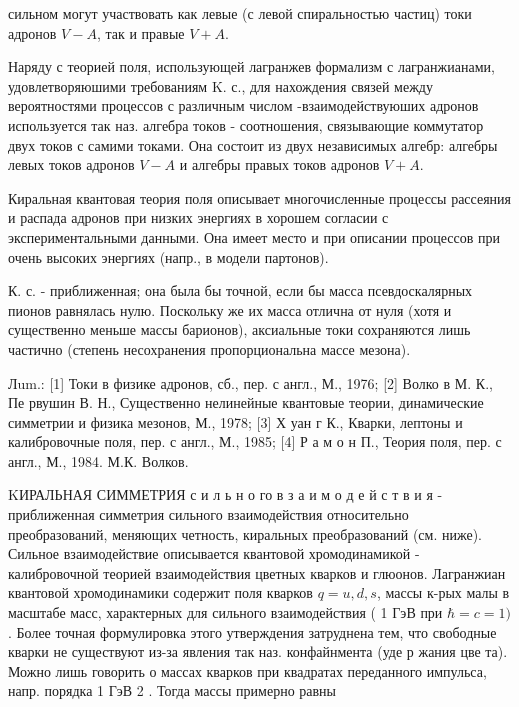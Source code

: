 \documentclass[10pt]{article}
\begin{document}
сильном могут участвовать как левые (с левой спиральностью частиц) токи адронов $V-A$, так и правые $V+A$.



Наряду с теорией поля, использующей лагранжев формализм с лагранжианами, удовлетворяюшими требованиям K. с., для нахождения связей между вероятностями процессов с различным числом -взаимодействуюших адронов используется так наз. алгебра токов - соотношения, связывающие коммутатор двух токов с самими токами. Она состоит из двух независимых алгебр: алгебры левых токов адронов $V-A$ и алгебры правых токов адронов $V+A$.



Киральная квантовая теория поля описывает многочисленные процессы рассеяния и распада адронов при низких энергиях в хорошем согласии с экспериментальными данными. Она имеет место и при описании процессов при очень высоких энергиях (напр., в модели партонов).



К. с. - приближенная; она была бы точной, если бы масса псевдоскалярных пионов равнялась нулю. Поскольку же их масса отлична от нуля (хотя и существенно меньше массы барионов), аксиальные токи сохраняются лишь частично (степень несохранения пропорциональна массе мезона).



Лum.: [1] Токи в физике адронов, сб., пер. с англ., М., 1976; [2] Волко в М. К., Пе рвушин В. Н., Существенно нелинейные квантовые теории, динамические симметрии и физика мезонов, М., 1978; [3] Х уан г К., Кварки, лептоны и калибровочные поля, пер. с англ., М., 1985; [4] Р а м о н П., Теория поля, пер. с англ., М., 1984. М.К. Волков.



KИРАЛЬНАЯ СИММЕТРИЯ с и л ь н о го в з а и м о д е й с т в и я - приближенная симметрия сильного взаимодействия относительно преобразований, меняющих четность, киральных преобразований (см. ниже). Сильное взаимодействие описывается квантовой хромодинамикой - калибровочной теорией взаимодействия цветных кварков и глюонов. Лагранжиан квантовой хромодинамики содержит поля кварков $q=u, d, s$, массы к-рых малы в масштабе масс, характерных для сильного взаимодействия ( 1 ГэВ при $\hbar=c=1)$. Более точная формулировка этого утверждения затруднена тем, что свободные кварки не существуют из-за явления так наз. конфайнмента (уде р жания цве та). Можно лишь говорить о массах кварков при квадратах переданного импульса, напр. порядка 1 ГэВ 2 . Тогда массы примерно равны
\end{document}
